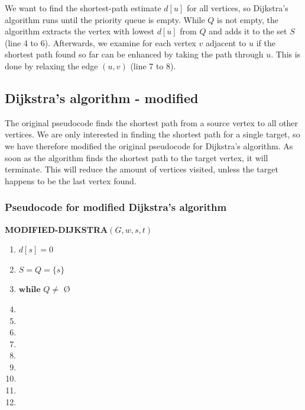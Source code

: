 \documentclass[11pt]{article}
\begin{document}
\noindent We want to find the shortest-path estimate $d[u]$ for all vertices, so Dijkstra's algorithm runs until the priority queue is empty. While $Q$ is not empty, the algorithm extracts the vertex with lowest $d[u]$ from $Q$ and adds it to the set $S$ (line 4 to 6). Afterwards, we examine for each vertex $v$ adjacent to $u$ if the shortest path found so far can be enhanced by taking the path through $u$. This is done by relaxing the edge $(u,v)$ (line 7 to 8).\\


\subsection{Dijkstra's algorithm - modified}
\noindent The original pseudocode finds the shortest path from a source vertex to all other vertices. We are only interested in finding the shortest path for a single target, so we have therefore modified the original pseudocode for Dijkstra's algorithm. As soon as the algorithm finds the shortest path to the target vertex, it will terminate. This will reduce the amount of vertices visited, unless the target happens to be the last vertex found.\\
\subsubsection{Pseudocode for modified Dijkstra's algorithm}
\hspace{4ex}\textbf{MODIFIED-DIJKSTRA$(G, w, s, t)$}
\begin{enumerate}
\setlength\itemsep{0em}
\item $d[s] = 0$
\item $S = Q = \{s\}$
\item $\textbf{while } Q \neq  $ \O
\item {}
\item {}
\item \tab{}
\item {}
\item \tab{}
\item \tab{}\tab{}
\item \tab{}\tab{}
\item \tab{}\tab{}
\item \tab{}\tab{}
\end{enumerate}
\end{document}
